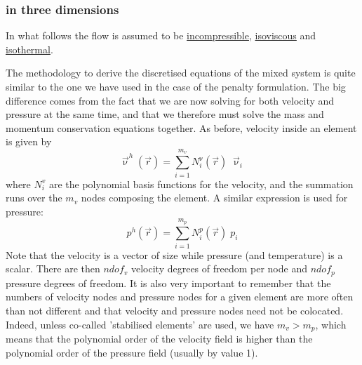 \label{sec_mixed}

\subsubsection{in three dimensions}

In what follows the flow is assumed to be \underline{incompressible}, 
\underline{isoviscous} and \underline{isothermal}. 

The methodology to derive the discretised equations of the mixed system is 
quite similar to the one we have used in the case of the penalty formulation.
The big difference comes from the fact that we are now solving for both 
velocity and pressure at the same time, and that we therefore must solve 
the mass and momentum conservation equations together.
As before, velocity inside an element is given by 
\begin{equation}
{\vec \upnu}^h({\vec r})=\sum_{i=1}^{m_v} N_i^\upnu({\vec r})\;  {\vec \upnu}_i
\label{mixed01}
\end{equation}
where $N_i^{v}$ are the polynomial basis functions for the velocity,
and the summation runs over the $m_v$ nodes composing the element.
A similar expression is used for pressure:
\begin{equation}
p^h({\vec r})=\sum_{i=1}^{m_p} N_i^p({\vec r}) \; p_i
\label{mixed02}
\end{equation}
Note that the velocity is a vector of size while pressure (and temperature)
is a scalar. There are then $ndof_v$ velocity degrees of freedom per node
and $ndof_p$ pressure degrees of freedom.
It is also very important to remember that the numbers of 
velocity nodes and pressure nodes for a given element 
are more often than not different and that velocity and pressure
nodes need not be colocated. Indeed, unless 
co-called 'stabilised elements' are used, we have $m_v>m_p$, which 
means that the polynomial order of the velocity field is higher than 
the polynomial order of the pressure field (usually by value 1).


